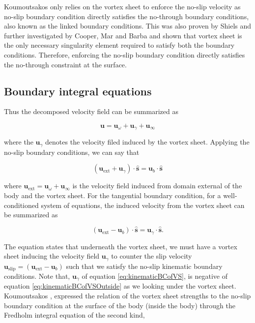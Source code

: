Koumoutsakos \cite{Koumoutsakos1993} only relies on the vortex sheet to enforce the no-slip velocity as no-slip boundary condition directly satisfies the no-through boundary conditions, also known as the linked boundary conditions. This was also proven by Shiels \cite{Shiels1998} and further investigated by Cooper, Mar and Barba \cite{Cooper2009b} and shown that vortex sheet is the only necessary singularity element required to satisfy both the boundary conditions. Therefore, enforcing the no-slip boundary condition directly satisfies the no-through constraint at the surface.

\subsection{Boundary integral equations}
Thus the decomposed velocity field can be summarized as

	\begin{equation}
	\mathbf{u} = \mathbf{u}_{\omega} + \mathbf{u}_{\gamma} + \mathbf{u}_{\infty}
	\end{equation}
	
where the $\mathbf{u}_{\gamma}$ denotes the velocity filed induced by the vortex sheet. Applying the no-slip boundary conditions, we can say that

	\begin{equation}
	\left(\mathbf{u}_{\mathrm{ext}} + \mathbf{u}_{\gamma}\right)\cdot\mathbf{\hat{s}} = \mathbf{u}_b \cdot \mathbf{\hat{s}}
	\label{eq:kinematicBCofVSOutside}
	\end{equation}

where $\mathbf{u}_{\mathrm{ext}} = \mathbf{u}_{\omega} + \mathbf{u}_{\infty}$ is the velocity field induced from domain external of the body and the vortex sheet. For the tangential boundary condition, for a well-conditioned system of equations, the induced velocity from the vortex sheet can be summarized as  

	\begin{equation}
	\left(\mathbf{u}_{\mathrm{ext}} - \mathbf{u}_b\right) \cdot \mathbf{\hat{s}} = \mathbf{u}_{\gamma}\cdot\mathbf{\hat{s}}.
	\label{eq:kinematicBCofVS}
	\end{equation}

The equation states that underneath the vortex sheet, we must have a vortex sheet inducing the velocity field $\mathbf{u}_{\gamma}$ to counter the slip velocity $\mathbf{u}_{\mathrm{slip}} = \left(\mathbf{u}_{\mathrm{ext}} - \mathbf{u}_b\right)$ such that we satisfy the no-slip kinematic boundary conditions. Note that, $\mathbf{u}_{\gamma}$ of equation \ref{eq:kinematicBCofVS}, is negative of equation \ref{eq:kinematicBCofVSOutside} as we looking under the vortex sheet. Koumoutsakos \cite{Koumoutsakos1993}, expressed the relation of the vortex sheet strengths to the no-slip boundary condition at the surface of the body (inside the body) through the Fredholm integral equation of the second kind,

